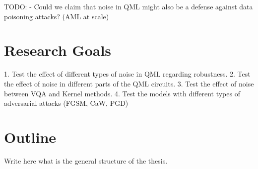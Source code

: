 TODO\@:
- Could we claim that noise in QML might also be a defense against data poisoning attacks? (AML at scale)~\cite{kurakin_adversarial_2017}

\section{Research Goals}
1. Test the effect of different types of noise in QML regarding robustness.
2. Test the effect of noise in different parts of the QML circuits.
3. Test the effect of noise between VQA and Kernel methods.
4. Test the models with different types of adversarial attacks (FGSM, CaW, PGD)

\section{Outline}
Write here what is the general structure of the thesis.